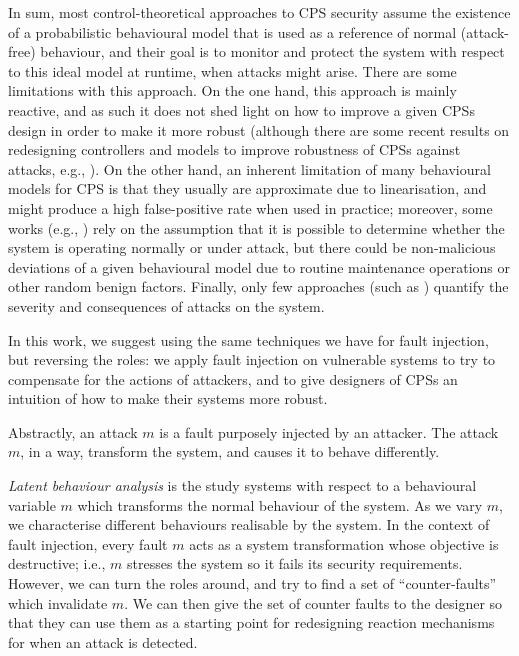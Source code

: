 {%
In sum, most control-theoretical approaches to CPS security assume the existence of a probabilistic behavioural model that is used as a reference of normal (attack-free) behaviour, and their goal is to monitor and protect the system with respect to this ideal model at runtime, when attacks might arise. There are some limitations with this approach. On the one hand, this approach is mainly reactive, and as such it does not shed light on how to improve a given CPSs design in order to make it more robust (although there are some recent results on {redesigning controllers and models} to improve robustness of CPSs against attacks, e.g., \cite{Carlos_Justin3,Weerakkody}). On the other hand, an inherent limitation of many behavioural models for CPS is that they usually are approximate due to linearisation, and might produce a high false-positive rate when used in practice; moreover, some works (e.g., \cite{LimitingImpactStealthyAttacks,CPSDetectingIntegrityAttacksScada,IFCPSSec}) rely on the assumption that it is possible to determine whether the system is operating normally or under attack, but there could be non-malicious deviations of a given behavioural model due to routine maintenance operations or other random benign factors. Finally, only few approaches (such as \cite{IFCPSSec,Gupta2,Carlos_Justin3}) quantify the severity and consequences of attacks on the system.%
}


In this work, we suggest using the same techniques we have for fault injection, but reversing the roles: we apply fault injection on vulnerable systems to try to compensate for the actions of attackers, and to give designers of CPSs an intuition of how to make their systems more robust.

Abstractly, an attack $m$ is a fault purposely injected by an attacker. The attack $m$, in a way, transform the system, and causes it to behave differently. 

\emph{Latent behaviour analysis} is the study systems with respect to a behavioural variable $m$ which transforms the normal behaviour of the system. As we vary $m$, we characterise different behaviours realisable by the system. In the context of fault injection, every fault $m$ acts as a system transformation whose objective is destructive; i.e., $m$ stresses the system so it fails its security requirements. However, we can turn the roles around, and try to find a set of ``counter-faults'' which invalidate $m$. We can then give the set of counter faults to the designer so that they can use them as a starting point for redesigning reaction mechanisms for when an attack is detected. 


